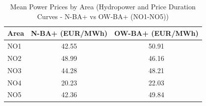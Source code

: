 \begin{table}[htbp]
\centering
\caption{Mean Power Prices by Area (Hydropower and Price Duration Curves - N-BA+ vs OW-BA+ (NO1-NO5))}
\label{tab:mean_prices_NO_areas_N_OW_uprate}
\begin{tabular}{lcc}
\hline
Area & N-BA+ (EUR/MWh) & OW-BA+ (EUR/MWh) \\
\hline
NO1 & 42.55 & 50.91 \\
NO2 & 48.99 & 46.16 \\
NO3 & 44.28 & 48.21 \\
NO4 & 20.23 & 22.03 \\
NO5 & 42.36 & 49.84 \\
\hline
\end{tabular}
\end{table}